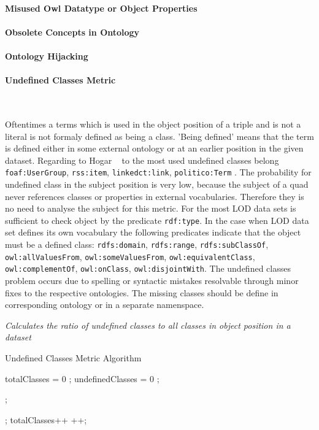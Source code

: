 \paragraph{Misused Owl Datatype or Object Properties}
\paragraph{Obsolete Concepts in Ontology}
\paragraph{Ontology Hijacking}
\paragraph{Undefined Classes Metric} ~\\ 
\label{par:undefClass}

Oftentimes a terms which is used in the object position of a triple and is not a literal is not formaly defined as being a class.
'Being defined' means that the term is defined either in some external ontology or at an earlier position in the given dataset. 
Regarding to Hogar ~\cite{hogan2010} to the most used undefined classes belong \texttt{foaf:UserGroup}, \texttt{rss:item}, \texttt{linkedct:link}, \texttt{politico:Term} .
The probability for undefined class in the subject position is very low, because the subject of a quad never references classes or properties in external vocabularies.
Therefore they is no need to analyse the subject for this metric.
For the most LOD data sets is sufficient to check object by the predicate \texttt{rdf:type}. 
In the case when LOD data set defines its own vocabulary the following predicates indicate that the object must be a defined class:  \texttt{rdfs:domain}, \texttt{rdfs:range}, \texttt{rdfs:subClassOf}, \texttt{owl:allValuesFrom}, \texttt{owl:someValuesFrom}, \texttt{owl:equivalentClass}, \texttt{owl:complementOf}, \texttt{owl:onClass}, \texttt{owl:disjointWith}.
The undefined classes problem occurs due to spelling or syntactic mistakes resolvable through minor fixes to the respective ontologies.
The missing classes should be define in corresponding ontology or in a separate namenspace.


\begin{mdframed}[style=metricdefinition]
\emph{Calculates the ratio of undefined classes to all classes in object position in a dataset}
\end{mdframed}


\begin{algorithm}
\caption{Undefined Classes Metric Algorithm}\label{lst:undefCl}
\begin{algorithmic}[1]
\State totalClasses = 0 ;
\State undefinedClasses = 0 ;
\EndProcedure

 ; 

; \EndIf
\EndIf
\State totalClasses++ ++;
\EndProcedure
\end{algorithmic}
\end{algorithm}

